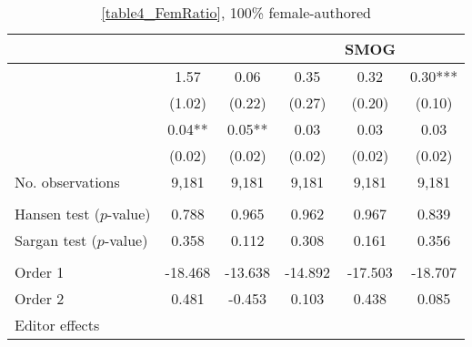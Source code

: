 \begin{table}
    \footnotesize
    \centering
    \begin{threeparttable}
        \caption{\autoref{table4_FemRatio}, 100\% female-authored}
        \label{table4_Fem100}
        \begin{tabular}{p{4cm}S@{}S@{}S@{}S@{}S@{}}
            \toprule
            &{}&{}&{}&{SMOG}&{}\\
            \midrule
            &        1.57   &        0.06   &        0.35   &        0.32   &        0.30***\\
                                          &      (1.02)   &      (0.22)   &      (0.27)   &      (0.20)   &      (0.10)   \\
            &        0.04** &        0.05** &        0.03   &        0.03   &        0.03   \\
                                          &      (0.02)   &      (0.02)   &      (0.02)   &      (0.02)   &      (0.02)   \\
            \midrule
            No. observations     &       9,181   &       9,181   &       9,181   &       9,181   &       9,181   \\
             \\
            \quad Hansen test (\(p\)-value)&       0.788   &       0.965   &       0.962   &       0.967   &       0.839   \\
            \quad Sargan test (\(p\)-value)&       0.358   &       0.112   &       0.308   &       0.161   &       0.356   \\
             \\
            \quad Order 1&     -18.468   &     -13.638   &     -14.892   &     -17.503   &     -18.707   \\
            \quad Order 2                 &       0.481   &      -0.453   &       0.103   &       0.438   &       0.085   \\
            \midrule
            Editor effects       &           {}   &           {}   &           {}   &           {}   &           {}   \\

\end{tabular}
\end{threeparttable}
\end{table}

